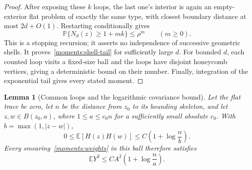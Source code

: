 \documentclass[11pt]{article}
\newcommand{\E}{\mathbb E}
\newcommand{\Prob}{\mathbb P}
\newtheorem{lemma}[theorem]{Lemma}
\theoremstyle{definition}
\theoremstyle{remark}
\numberwithin{equation}{section}
\begin{document}
\begin{proof}
After exposing these $k$ loops, the last one's interior is again an
empty-exterior flat problem of exactly the same type, with closest
boundary distance at most $2d+O(1)$.  Restarting conditionally gives
\[
 \Prob\{N_d(z)\geq1+mk\}\leq\rho^m\qquad(m\geq0).
\]
This is a stopping recursion; it asserts no independence of successive
geometric shells.  It proves~\eqref{moments:shell-tail} for sufficiently
large $d$.  For bounded $d$, each counted loop visits a fixed-size ball
and the loops have disjoint honeycomb vertices, giving a deterministic
bound on their number.  Finally, integration of the exponential tail
gives every stated moment.
\end{proof}

\begin{lemma}[Common loops and the logarithmic covariance bound]
\label{moments:covariance}
Let the flat trace be zero, let $n$ be the distance from $z_0$ to its
bounding skeleton, and let $z,w\in B(z_0,a)$, where
$1\leq a\leq c_0n$ for a sufficiently small absolute $c_0$.  With
$b=\max(1,|z-w|)$,
\begin{equation}\label{moments:covariance-bound}
 0\leq\E[H(z)H(w)]
 \leq C\left(1+\log\frac{n}{b}\right).
\end{equation}
Every smearing~\eqref{moments:weights} in this ball therefore satisfies
\begin{equation}\label{moments:second-moment}
 \E Y^2\leq C A^2\left(1+\log\frac{n}{a}\right).
\end{equation}
\end{lemma}
\end{document}
